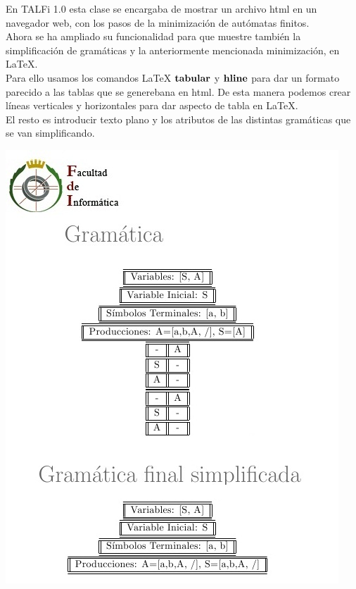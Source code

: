 \documentclass[12pt,a4paper,spanish]{book}
\begin{document}
En TALFi 1.0 esta clase se encargaba de mostrar un archivo html en un navegador web, con los pasos de la minimizaci\'on de aut\'omatas finitos.\\
\newline
Ahora se ha ampliado su funcionalidad para que muestre tambi\'en la simplificaci\'on de gram\'aticas y la anteriormente mencionada minimizaci\'on, en \LaTeX{}.\\
\newline
Para ello usamos los comandos \LaTeX{} $\bf{tabular}$ y $\bf{hline}$ para dar un formato parecido a las tablas que se generebana en html. De esta manera podemos crear l\'ineas verticales y horizontales para dar aspecto de tabla en \LaTeX{}.\\
\newline
El resto es introducir texto plano y los atributos de las distintas gram\'aticas que se van simplificando.
\newpage
\begin{center}
\includegraphics{late3.jpg}
\end{center}
\newpage
\end{document}
